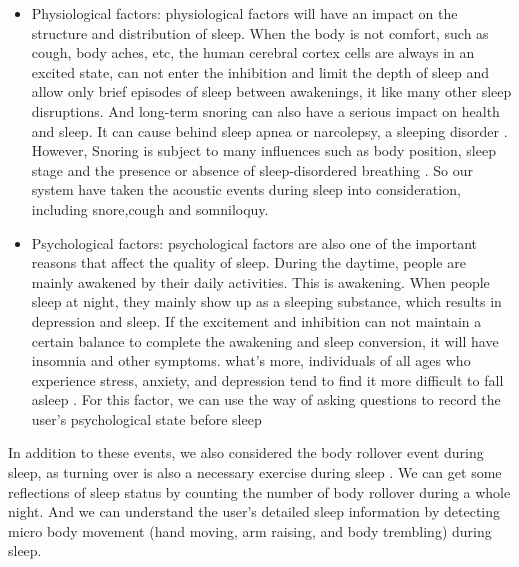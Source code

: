 \begin{itemize}
  \item Physiological factors: physiological factors will have an impact on the structure and distribution of sleep. When the body is not comfort, such as cough, body aches, etc, the human cerebral cortex cells are always in an excited state, can not enter the inhibition and limit the depth of sleep and allow only brief episodes of sleep between awakenings, it like many other sleep disruptions. And long-term snoring can also have a serious impact on health and sleep. It can cause behind sleep apnea or narcolepsy, a sleeping disorder \cite{snoring2016,snoring2013}. However, Snoring is subject to many influences such as body position, sleep stage and the presence or absence of sleep-disordered breathing \cite{snoring2010}. So our system have taken the acoustic events during sleep into consideration, including snore,cough and somniloquy.
  \item Psychological factors: psychological factors are also one of the important reasons that affect the quality of sleep. During the daytime, people are mainly awakened by their daily activities. This is awakening. When people sleep at night, they mainly show up as a sleeping substance, which results in depression and sleep. If the excitement and inhibition can not maintain a certain balance to complete the awakening and sleep conversion, it will have insomnia and other symptoms. what's more, individuals of all ages who experience stress, anxiety, and depression tend to find it more difficult to fall asleep \cite{mood2003,light2007,mood2015}. For this factor, we can use the way of asking questions to record the user's psychological state before sleep
\end{itemize}

In addition to these events, we also considered the body rollover event during sleep, as turning over is also a necessary exercise during sleep \cite{rollover2014,rollover201408}. We can get some reflections of sleep status by counting the number of body rollover during a whole night. And we can understand the user's detailed sleep information by detecting  micro body movement (hand moving, arm raising, and body trembling) during sleep.

